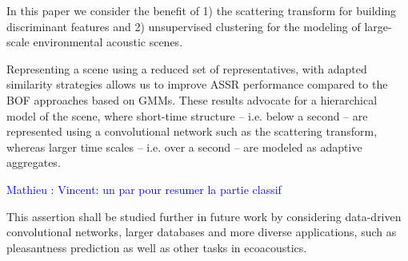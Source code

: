 \documentclass[journal]{IEEEtran}
\makeatletter
\newcommand*{\ie}{i.e.\@\xspace}
\newcommand{\ja}[1]{\textcolor{magenta}{Joakim : #1}}
\newcommand{\ml}[1]{\textcolor{blue}{ Mathieu : #1}}
\makeatother
\begin{document}
In this paper we consider the benefit of 1) the scattering transform for building discriminant features and 2) unsupervised clustering for the modeling of large-scale environmental acoustic scenes.

Representing a scene using a reduced set of representatives, with adapted similarity strategies allows us to improve ASSR performance compared to the BOF approaches based on GMMs. These results advocate for a hierarchical model of the scene, where short-time structure -- \ie below a second -- are represented using a convolutional network such as the scattering transform, whereas larger time scales -- \ie over a second -- are modeled as adaptive aggregates.

\ml{Vincent: un par pour resumer la partie classif}

This assertion shall be studied further in future work by considering data-driven convolutional networks, larger databases and more diverse applications, such as pleasantness prediction \cite{lafaySoundscapePilot, lafayPartI} as well as other tasks in ecoacoustics.




% 



\end{document}
